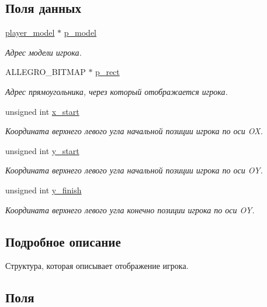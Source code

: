 \subsection*{Поля данных}
\begin{DoxyCompactItemize}
\item 
\hyperlink{structplayer__model}{player\+\_\+model} $\ast$ \hyperlink{structplayer__view_a8b8e41d687b369127d82d1271aca29ac}{p\+\_\+model}
\begin{DoxyCompactList}\small\item\em Адрес модели игрока. \end{DoxyCompactList}\item 
A\+L\+L\+E\+G\+R\+O\+\_\+\+B\+I\+T\+M\+AP $\ast$ \hyperlink{structplayer__view_adcfa5be54e3ef23cbd19acdcfef206c4}{p\+\_\+rect}
\begin{DoxyCompactList}\small\item\em Адрес прямоугольника, через который отображается игрока. \end{DoxyCompactList}\item 
unsigned int \hyperlink{structplayer__view_ae75fedba07d294d1f98716a0023641e6}{x\+\_\+start}
\begin{DoxyCompactList}\small\item\em Координата верхнего левого угла начальной позиции игрока по оси OX. \end{DoxyCompactList}\item 
unsigned int \hyperlink{structplayer__view_a35d236e445af2ed345f6b6147ea66aca}{y\+\_\+start}
\begin{DoxyCompactList}\small\item\em Координата верхнего левого угла начальной позиции игрока по оси OY. \end{DoxyCompactList}\item 
unsigned int \hyperlink{structplayer__view_ad5e7e7b6013080b75bb111b86634571d}{y\+\_\+finish}
\begin{DoxyCompactList}\small\item\em Координата верхнего левого угла конечно позиции игрока по оси OY. \end{DoxyCompactList}\end{DoxyCompactItemize}


\subsection{Подробное описание}
Структура, которая описывает отображение игрока. 

\subsection{Поля}
\mbox{\label{structplayer__view_a8b8e41d687b369127d82d1271aca29ac}} 
